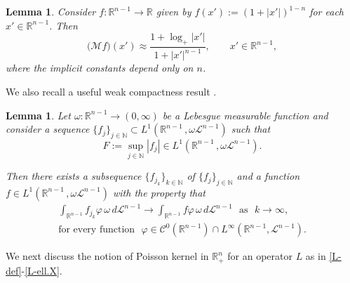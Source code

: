 \documentclass[11pt,reqno]{amsart}
\numberwithin{equation}{section}
\newtheorem{lemma}[theorem]{Lemma}
\theoremstyle{remark}
\begin{document}
\begin{lemma}\label{lemma:M-ball}
Consider $f:\mathbb{R}^{n-1}\to\mathbb{R}$ given by $f(x'):=(1+|x'|)^{1-n}$ for each $x'\in\mathbb{R}^{n-1}$. 
Then 
%
\begin{equation}\label{eq:M2-ball}
\big(\mathcal{M}f\big)(x')\approx\frac{1+\log_{+}|x'|}{1+|x'|^{n-1}},\qquad x'\in{\mathbb{R}}^{n-1},
\end{equation}
%
where the implicit constants depend only on $n$.
\end{lemma}

We also recall a useful weak compactness result \cite[Lemma~4.6.1, p.\,822]{GHA.III}. 

\begin{lemma}\label{ydadHBB}
Let $\omega:{\mathbb{R}}^{n-1}\to(0,\infty)$ be a Lebesgue measurable function and
consider a sequence $\{f_j\}_{j\in{\mathbb{N}}}\subset L^1({\mathbb{R}}^{n-1}\,,\omega{\mathscr{L}}^{n-1})$ such that 
%
\begin{equation}\label{JGTrad}
F:=\sup\limits_{j\in{\mathbb{N}}}|f_j|\in L^1({\mathbb{R}}^{n-1}\,,\omega{\mathscr{L}}^{n-1}).
\end{equation}

Then there exists a subsequence $\big\{f_{j_k}\big\}_{k\in{\mathbb{N}}}$ of $\{f_j\}_{j\in{\mathbb{N}}}$
and a function $f\in L^1({\mathbb{R}}^{n-1}\,,\omega{\mathscr{L}}^{n-1})$ with the property that
%
\begin{equation}\label{eq:16t44}
\begin{array}{c}
\displaystyle
\int_{{\mathbb{R}}^{n-1}}f_{j_k}\varphi\,\omega\,d{\mathscr{L}}^{n-1}\longrightarrow
\int_{{\mathbb{R}}^{n-1}}f\varphi\,\omega\,d{\mathscr{L}}^{n-1}\,\,\text{ as }\,\,k\to\infty,
\\[10pt]
\text{for every function }\,\,\varphi\in{\mathscr{C}}^0({\mathbb{R}}^{n-1})\cap L^\infty({\mathbb{R}}^{n-1},{\mathscr{L}}^{n-1}).
\end{array}
\end{equation}
\end{lemma}

We next discuss the notion of Poisson kernel in ${\mathbb{R}}^n_{+}$
for an operator $L$ as in \eqref{L-def}-\eqref{L-ell.X}.
\end{document}
